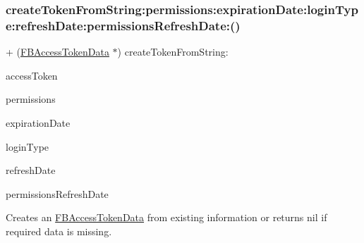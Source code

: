 \subsubsection{\texorpdfstring{create\+Token\+From\+String\+:permissions\+:expiration\+Date\+:login\+Type\+:refresh\+Date\+:permissions\+Refresh\+Date\+:()}{createTokenFromString:permissions:expirationDate:loginType:refreshDate:permissionsRefreshDate:()}\hspace{0.1cm}{\footnotesize\ttfamily [4/5]}}
{\footnotesize\ttfamily + (\hyperlink{interfaceFBAccessTokenData}{F\+B\+Access\+Token\+Data} $\ast$) create\+Token\+From\+String\+: \begin{DoxyParamCaption}\item[{(N\+S\+String $\ast$)}]{access\+Token }\item[{permissions:(N\+S\+Array $\ast$)}]{permissions }\item[{expirationDate:(N\+S\+Date $\ast$)}]{expiration\+Date }\item[{loginType:(F\+B\+Session\+Login\+Type)}]{login\+Type }\item[{refreshDate:(N\+S\+Date $\ast$)}]{refresh\+Date }\item[{permissionsRefreshDate:(N\+S\+Date $\ast$)}]{permissions\+Refresh\+Date }\end{DoxyParamCaption}}

Creates an \hyperlink{interfaceFBAccessTokenData}{F\+B\+Access\+Token\+Data} from existing information or returns nil if required data is missing.


